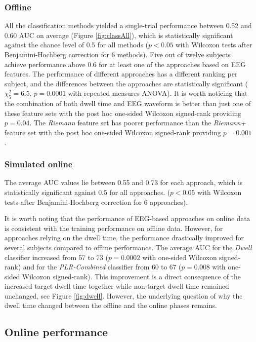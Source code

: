 \documentclass[12pt]{iopart}
\begin{document}
\subsubsection*{Offline}
All the classification methods yielded a single-trial 
performance between 0.52 and 0.60 AUC on average
(Figure \ref{fig:classAll}),
which is statistically significant against the chance level of 0.5 
for all methods
($p < 0.05$ with Wilcoxon tests after Benjamini-Hochberg correction
for 6 methods).
Five out of twelve subjects achieve performance 
above 0.6 for at least one of the approaches based
on EEG features.
The performance of different approaches has a different ranking per subject,
and the differences between
the approaches are statistically significant ($\chi^2_5 = 6.5$, $p = 0.0001$ with repeated measures ANOVA).
It is worth noticing that the combination of both dwell time and EEG waveform is
better than just one of these feature sets with the post hoc 
one-sided Wilcoxon signed-rank providing $p = 0.04$.
The \textit{Riemann} feature set has poorer performance than the \textit{Riemann+}
feature set with the post hoc
one-sided Wilcoxon signed-rank providing $p = 0.001$.

\subsubsection*{Simulated online}
The average AUC values lie between 0.55 and 0.73 for each approach,
which is statistically significant against 0.5
for all approaches.
($p < 0.05$ with Wilcoxon tests after Benjamini-Hochberg correction 
for 6 approaches).

It is worth noting that the performance of EEG-based approaches
on online data is consistent with the training performance on offline data.
However, for approaches relying on the dwell time, the performance drastically improved
for several subjects compared to offline performance.
The average AUC for the \textit{Dwell} classifier increased
from 57 to 73 ($p = 0.0002$ with one-sided Wilcoxon signed-rank) and for 
the \textit{PLR-Combined} classifier from 60 to 67 ($p = 0.008$ with one-sided Wilcoxon signed-rank).
This improvement is a direct consequence of the increased target dwell time
together while non-target dwell time remained unchanged, see Figure \ref{fig:dwell}.
However, the underlying question of why the dwell time changed 
between the offline and the online phases remains.


\subsection{Online performance}
\end{document}
